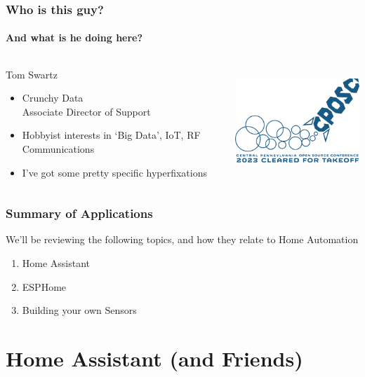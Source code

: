 \documentclass[aspectratio=169]{beamer}
\begin{document}
\begin{frame}
  \frametitle{Who is this guy?}
  \framesubtitle{And what is he doing here?}
  \begin{columns}[]
    \begin{column}[T]{0.45\paperwidth}
      {\huge Tom Swartz}
      \vfill
      \begin{itemize}[<+->]
        \item{Crunchy Data \\ Associate Director of Support} 
        \item{Hobbyist interests in `Big Data', IoT, RF Communications}
        \item{I've got some pretty specific hyperfixations}
      \end{itemize}
    \end{column}
    \begin{column}[T]{0.45\paperwidth}
      \includegraphics[height=4cm,keepaspectratio]{images/logo.png}
    \end{column}
  \end{columns}
\end{frame}

\begin{frame}
  \frametitle{Summary of Applications}
  We'll be reviewing the following topics, and how they relate to Home Automation
  \begin{enumerate}
    \item{Home Assistant}
    \item{ESPHome}
    \item{Building your own Sensors}
  \end{enumerate}
\end{frame}

\section{Home Assistant (and Friends)}
\frame{\sectionpage}
\end{document}
